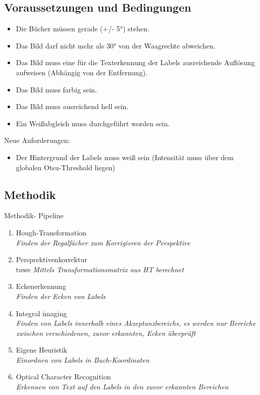 \documentclass[paper=A4, deutsch]{scrartcl}
\begin{document}
\subsection{Voraussetzungen und Bedingungen}
\begin{itemize}
  \item Die Bücher müssen gerade (+/- 5°) stehen.
  \item Das Bild darf nicht mehr als 30° von der Waagrechte abweichen.
  \item Das Bild muss eine für die Texterkennung der Labels ausreichende Auflösung aufweisen (Abhängig von der Entfernung).
  \item Das Bild muss farbig sein.
  \item Das Bild muss ausreichend hell sein. 
  \item Ein Weißabgleich muss durchgeführt worden sein.
\end{itemize}

Neue Anforderungen:
\begin{itemize}
  \item Der Hintergrund der Labels muss weiß sein (Intensität muss über dem globalen Otsu-Threshold liegen)
\end{itemize}

\subsection{Methodik}
Methodik- Pipeline
\begin{enumerate}
	\item Hough-Transformation\\
		\textit{Finden der Regalfächer zum Korrigieren der Perspektive}
	\item Persprektivenkorrektur\\tuwe
		\textit{Mittels Transformationsmatrix aus HT berechnet}
	\item Eckenerkennung\\
		\textit{Finden der Ecken von Labels}
	\item Integral imaging\\
		\textit{Finden von Labels innerhalb eines Akzeptanzbereichs, es werden nur Bereiche zwischen verschiedenen, zuvor erkannten, Ecken überprüft}
	\item Eigene Heuristik\\
		\textit{Einordnen von Labels in Buch-Koordinaten}
	\item Optical Character Recognition\\
		\textit{Erkennen von Text auf den Labels in den zuvor erkannten Bereichen}
\end{enumerate}
\end{document}
